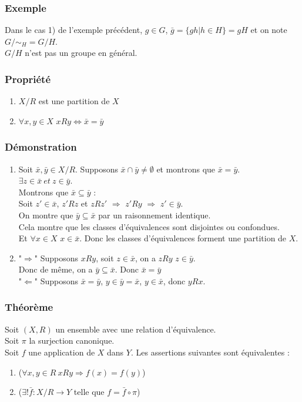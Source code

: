 \documentclass[a4paper, oneside]{report}
\begin{document}
\subsubsection{Exemple}
Dans le cas 1) de l'exemple précédent, $g\in G$, $\bar{g}=\{gh|h\in H \}=gH$ et on note $G/\sim_H=G/H$.\\
$G/H$ n'est pas un groupe en général.

\subsubsection{Propriété}
\begin{enumerate}
\item $X/R$ est une partition de $X$
\item $\forall x,y\in X$ $xRy\Leftrightarrow \bar{x}=\bar{y}$
\end{enumerate}

\subsubsection{Démonstration}
\begin{enumerate}
\item Soit $\bar{x},\bar{y}\in X/R$. Supposons $\bar{x}\cap \bar{y}\neq \emptyset$ et montrons que $\bar{x}=\bar{y}$.\\
$\exists z\in \bar{x}~et~z\in \bar{y}$.\\
Montrons que $\bar{x}\subseteq \bar{y}$ :\\
Soit $z'\in \bar{x}$, $z'Rz$ et $zRz'$ $\Rightarrow$ $z'Ry$ $\Rightarrow$ $z'\in \bar{y}$.\\
On montre que $\bar{y}\subseteq \bar{x}$ par un raisonnement identique.\\
Cela montre que les classes d'équivalences sont disjointes ou confondues.\\
Et $\forall x\in X$ $x\in \bar{x}$. Donc les classes d'équivalences forment une partition de $X$.\\

\item "$\Rightarrow$" Supposons $xRy$, soit $z\in \bar{x}$, on a $ zRy$ $z\in \bar{y}$.\\
Donc de même, on a $\bar{y}\subseteq \bar{x}$. Donc $\bar{x}=\bar{y}$\\
"$\Leftarrow$" Supposons $\bar{x}=\bar{y}$, $y\in \bar{y}=\bar{x}$, $y\in \bar{x}$, donc $yRx$.
\end{enumerate}

\subsubsection{Théorème}
Soit $(X,R)$ un ensemble avec une relation d'équivalence.\\
Soit $\pi$ la surjection canonique.\\
Soit $f$ une application de $X$ dans $Y$. Les assertions suivantes sont équivalentes :
\begin{enumerate}
\item ($\forall x,y \in R~xRy\Rightarrow f(x)=f(y)$)
\item ($\exists ! \bar{f}: X/R \rightarrow Y$ telle que $f=\bar{f}\circ \pi$)
\end{enumerate}
\end{document}
